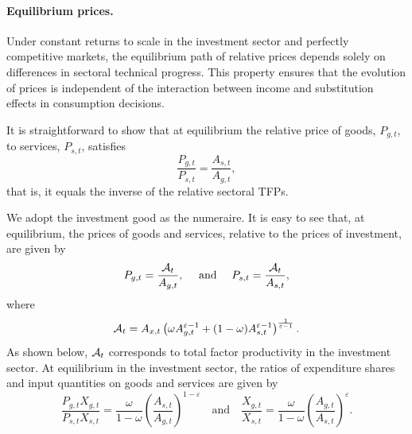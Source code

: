 \documentclass[12pt,a4paper]{article}
\begin{document}
\paragraph{Equilibrium prices.}

Under constant returns to scale in the investment sector and perfectly competitive markets, the equilibrium path of relative prices depends solely on differences in sectoral technical progress.  
This property ensures that the evolution of prices is independent of the interaction between income and substitution effects in consumption decisions.

It is straightforward to show that at equilibrium the relative price of goods, \( P_{g,t} \), to services, \( P_{s,t} \), satisfies
\[
\frac{P_{g,t}}{P_{s,t}} = \frac{A_{s,t}}{A_{g,t}},
\]
that is, it equals the inverse of the relative sectoral TFPs.


We adopt the investment good as the numeraire. 
It is easy to see that, at equilibrium, the prices of goods and services, relative to the prices of investment, are given by
\begin{equation}\label{eq:Pj}
P_{g,t} = \frac{{\cal A}_{t}}{ A_{g,t}}, 
\ \ \ \ \text{and}\ \ \ \
P_{s,t} = \frac{{\cal A}_{t}}{ A_{s,t}}, 
\end{equation}
where
\begin{equation}\label{eq:calA}
{\cal A}_{t} = A_{x,t} \left( \omega A_{g,t} ^{\varepsilon - 1} + (1 - \omega) A_{s,t}^{\varepsilon - 1} \right)^{\frac{1}{\varepsilon - 1}}.
\end{equation}
As shown below, \( {\cal A}_{t} \) corresponds to total factor productivity in the investment sector.
At equilibrium in the investment sector, the ratios of expenditure shares and input quantities on goods and services are given by
\[
\frac{P_{g,t} X_{g,t}}{P_{s,t} X_{s,t}} = \frac{\omega}{1 - \omega} \left( \frac{A_{s,t}}{A_{g,t}} \right)^{1 - \varepsilon}
\quad \text{and} \quad
\frac{X_{g,t}}{X_{s,t}} = \frac{\omega}{1 - \omega} \left( \frac{A_{g,t}}{A_{s,t}} \right)^{\varepsilon}.
\]
\end{document}
